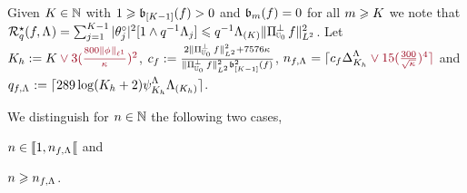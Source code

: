 \begin{pro}
Given $K\in\Nz$   with   $1\geq \bias[{[K-1] }](\xdf)>0$ and
$\bias(\xdf)=0$ for all $\Di\geq K$ we note that
$\mRa{\xdf,\iSv}=\sum_{j=1}^{K-1}|\fxdf[j]|^2[1\wedge\ssE^{-1}\iSv[j]]\leq
\ssE^{-1}\miSv[K]\VnormLp{\Proj[{\mHiH[0]}]^\perp\xdf}^2$. Let $K_{\ydf}:=K\dr\vee
3(\tfrac{800\Vnormlp[1]{\fydf}}{\cpen})^2$, 
$c_{\xdf}:=\tfrac{2\VnormLp{\Proj[{\mHiH[0]}]^\perp\xdf}^2+7576\cpen}{\VnormLp{\Proj[{\mHiH[0]}]^\perp\xdf}^2\bias[{[K-1]}]^2(\xdf)}$,
$\ssY_{\xdf,\iSv}=\ceil{c_{\xdf}\DipenSv[K_{\ydf}]\dr\vee15(\tfrac{300}{\sqrt{\cpen}})^4}$
and $\ssE_{\xdf,\iSv}:=\ceil{289\log(K_{\ydf}+2)\cmiSv[K_{\ydf}]\miSv[K_{\ydf}]}$.

We distinguish for $\ssY\in\Nz$ the following two
cases, \begin{inparaenum}[i]\renewcommand{\theenumi}{\dgrau\rm(\alph{enumi})}\item\label{pro:au:ub:co2:c1}
$\ssY\in\nsetro{1,\ssY_{\xdf,\iSv}}$ and \item\label{pro:au:ub:co2:c2}
$\ssY\geq\ssY_{\xdf,\iSv}$.\end{inparaenum}\\



\end{pro}
